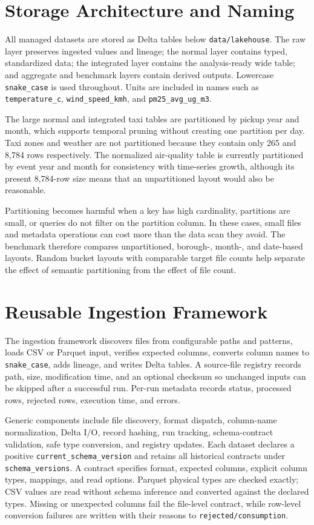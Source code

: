 \documentclass[10pt,a4paper]{article}
\begin{document}
\section{Storage Architecture and Naming}

All managed datasets are stored as Delta tables below
\texttt{data/lakehouse}. The raw layer preserves ingested values and lineage;
the normal layer contains typed, standardized data; the integrated layer
contains the analysis-ready wide table; and aggregate and benchmark layers
contain derived outputs. Lowercase \texttt{snake\_case} is used throughout.
Units are included in names such as \texttt{temperature\_c},
\texttt{wind\_speed\_kmh}, and \texttt{pm25\_avg\_ug\_m3}.

The large normal and integrated taxi tables are partitioned by pickup year and
month, which supports temporal pruning without creating one partition per day.
Taxi zones and weather are not partitioned because they contain only 265 and
8,784 rows respectively. The normalized air-quality table is currently
partitioned by event year and month for consistency with time-series growth,
although its present 8,784-row size means that an unpartitioned layout would
also be reasonable.

Partitioning becomes harmful when a key has high cardinality, partitions are
small, or queries do not filter on the partition column. In these cases, small
files and metadata operations can cost more than the data scan they avoid. The
benchmark therefore compares unpartitioned, borough-, month-, and date-based
layouts. Random bucket layouts with comparable target file counts help
separate the effect of semantic partitioning from the effect of file count.

\section{Reusable Ingestion Framework}

The ingestion framework discovers files from configurable paths and patterns,
loads CSV or Parquet input, verifies expected columns, converts column names to
\texttt{snake\_case}, adds lineage, and writes Delta tables. A source-file
registry records path, size, modification time, and an optional checksum so
unchanged inputs can be skipped after a successful run. Per-run metadata
records status, processed rows, rejected rows, execution time, and errors.

Generic components include file discovery, format dispatch, column-name
normalization, Delta I/O, record hashing, run tracking, schema-contract
validation, safe type conversion, and registry updates. Each dataset declares
a positive \texttt{current\_schema\_version} and retains all historical
contracts under \texttt{schema\_versions}. A contract specifies format,
expected columns, explicit column types, mappings, and read options. Parquet
physical types are checked exactly; CSV values are read without schema
inference and converted against the declared types. Missing or unexpected
columns fail the file-level contract, while row-level conversion failures are
written with their reasons to \texttt{rejected/consumption}.
\end{document}
